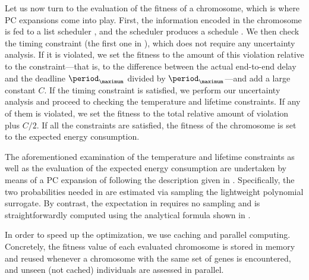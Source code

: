 Let us now turn to the evaluation of the fitness of a chromosome, which is where
\ac{PC} expansions come into play. First, the information encoded in the
chromosome is fed to a list scheduler \cite{adam1974}, and the scheduler
produces a schedule \schedule. We then check the timing constraint (the first
one in ), which does not require any
uncertainty analysis. If it is violated, we set the fitness to the amount of
this violation relative to the constraint---that is, to the difference between
the actual end-to-end delay and the deadline $\period_\maximum$ divided by
$\period_\maximum$---and add a large constant $C$. If the timing constraint is
satisfied, we perform our uncertainty analysis and proceed to checking the
temperature and lifetime constraints. If any of them is violated, we set the
fitness to the total relative amount of violation plus $C / 2$. If all the
constraints are satisfied, the fitness of the chromosome is set to the expected
energy consumption.

The aforementioned examination of the temperature and lifetime constraints as
well as the evaluation of the expected energy consumption are undertaken by
means of a \ac{PC} expansion of  following the
description given in . Specifically, the two
probabilities needed in  are estimated via
sampling the lightweight polynomial surrogate. By contrast, the expectation in
 requires no sampling and is
straightforwardly computed using the analytical formula shown in
.

\begin{remark}
In order to speed up the optimization, we use caching and parallel computing.
Concretely, the fitness value of each evaluated chromosome is stored in memory
and reused whenever a chromosome with the same set of genes is encountered, and
unseen (not cached) individuals are assessed in parallel.
\end{remark}
